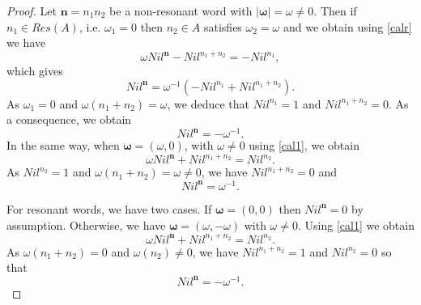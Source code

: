 \documentclass[english,11pt]{amsart}
\def\nn{\mathbf{n}}
\def\nn{\mathbf{n}}
\def\oo{\boldsymbol\omega}
\begin{document}
\begin{proof}
Let $\nn = n_1 n_2$ be a non-resonant word with $\mid \oo \mid =\omega \not= 0$. Then if $n_1\in Res (A)$, i.e. $\omega_1 =0$ then $n_2 \in A$ satisfies $\omega_2 =\omega$ and we obtain using  \eqref{calr} we have 
\begin{equation}
\omega  Nil^{\nn} -Nil^{n_1+n_2} = -Nil^{n_1} ,
\end{equation}
which gives
\begin{equation}
    Nil^{\nn} =\omega^{-1} \left ( -Nil^{n_1} +Nil^{n_1+n_2} \right ) .
\end{equation}
As $\omega_1 =0$ and $\omega (n_1 +n_2 )=\omega$, we deduce that $Nil^{n_1} =1$ and $Nil^{n_1 +n_2} =0$. As a consequence, we obtain
\begin{equation}
    Nil^{\nn} =-\omega^{-1} .
\end{equation}
In the same way, when $\oo =(\omega ,0)$, with $\omega \not= 0$ using \eqref{cal1}, we obtain
\begin{equation}
    \omega  Nil^{\nn} +Nil^{n_1 +n_2} = Nil^{n_2} .
\end{equation}
As $Nil^{n_2} =1$ and $\omega (n_1 +n_2)=\omega \not= 0$, we have $Nil^{n_1+n_2} =0$ and 
\begin{equation}
    Nil^{\nn} = \omega^{-1} .
\end{equation}

For resonant words, we have two cases. If $\oo = (0,0 )$ then $Nil^{\nn} =0$ by assumption. Otherwise, we have $\oo =(\omega , -\omega )$ with $\omega \not= 0$. Using \eqref{cal1} we obtain
\begin{equation}
    \omega  Nil^{\nn} +Nil^{n_1 +n_2} = Nil^{n_2} .
\end{equation}
As $\omega (n_1 +n_2 ) =0$ and $\omega (n_2)\not=0$, we have $Nil^{n_1+n_2} =1$ and $Nil^{n_2} =0$ so that 
\begin{equation}
    Nil^{\nn} =-\omega^{-1} .
\end{equation}
\end{proof}
\end{document}
